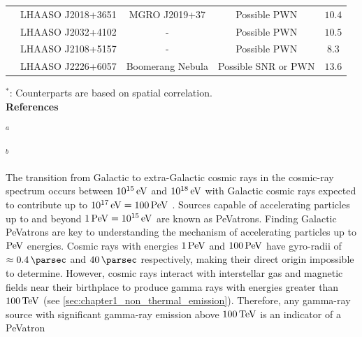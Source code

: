\begin{table}[h!]
{\begin{threeparttable}
\begin{tabular}{ccccc}
         & LHAASO J2018+3651 & MGRO J2019+37  & Possible PWN & $10.4$ \\
         & LHAASO J2032+4102 & - & Possible PWN & $10.5$ \\
         & LHAASO J2108+5157 & - & Possible PWN & $8.3$ \\
         & LHAASO J2226+6057 & Boomerang Nebula & Possible SNR or PWN & $13.6$ \\
         \hline
    \end{tabular}
    \begin{tablenotes}
	\item $^*$: Counterparts are based on spatial correlation.  \\
	\textbf{References}
	\item $^{a}$ \cite{2018APS..APRB17003B} 
	\item $^{b}$ \cite{2015MNRAS.449.3827K} 
    \end{tablenotes}
    \end{threeparttable}
    }
\end{table}
The transition from Galactic to extra-Galactic cosmic rays in the cosmic-ray spectrum occurs between $10^{15}\,\si{\electronvolt}$ and $10^{18}\,\si{\electronvolt}$ with Galactic cosmic rays expected to contribute up to $10^{17}\,\eV=100\,\PeV$ \citep{2016A&A...595A..33T}. Sources capable of accelerating particles up to and beyond $1\,\PeV=10^{15}\,\eV$ are known as PeVatrons. Finding Galactic PeVatrons are key to understanding the mechanism of accelerating particles up to $\PeV$ energies.
\newpar
Cosmic rays with energies $1\,\PeV$ and $100\,\PeV$ have gyro-radii of $\approx 0.4\,\pc$ and $40\,\pc$ respectively, making their direct origin impossible to determine. However, cosmic rays interact with interstellar gas and magnetic fields near their birthplace to produce gamma rays with energies greater than $100\,\TeV$ (see \autoref{sec:chapter1_non_thermal_emission}). Therefore, any gamma-ray source with significant gamma-ray emission above $100\,\TeV$ is an indicator of a PeVatron
\newpar 
